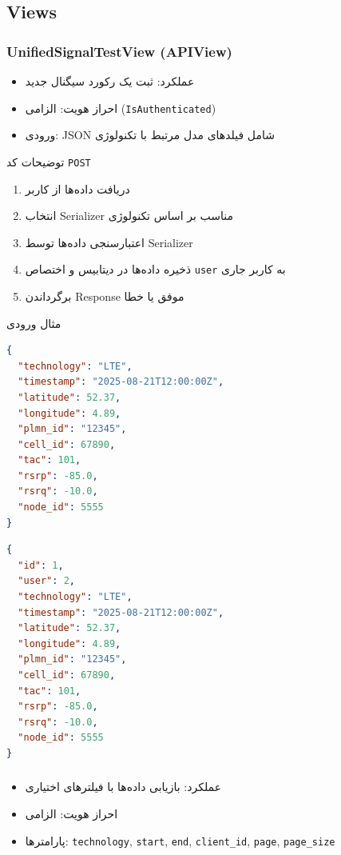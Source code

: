 \documentclass{report}
\begin{document}
\subsection{Views}
\subsubsection{UnifiedSignalTestView (APIView)}
\texttt{}
\begin{itemize}
    \item عملکرد: ثبت یک رکورد سیگنال جدید
    \item احراز هویت: الزامی (\texttt{IsAuthenticated})
    \item ورودی: JSON شامل فیلدهای مدل مرتبط با تکنولوژی
\end{itemize}

توضیحات کد   \texttt{POST}
\begin{enumerate}
    \item دریافت داده‌ها از کاربر
    \item انتخاب Serializer مناسب بر اساس تکنولوژی
    \item اعتبارسنجی داده‌ها توسط Serializer
    \item ذخیره داده‌ها در دیتابیس و اختصاص \texttt{user} به کاربر جاری
    \item برگرداندن Response موفق  یا خطا 
\end{enumerate}

مثال ورودی   \texttt{}
\begin{lstlisting}[language=json]
{
  "technology": "LTE",
  "timestamp": "2025-08-21T12:00:00Z",
  "latitude": 52.37,
  "longitude": 4.89,
  "plmn_id": "12345",
  "cell_id": 67890,
  "tac": 101,
  "rsrp": -85.0,
  "rsrq": -10.0,
  "node_id": 5555
}
\end{lstlisting}

\begin{lstlisting}[language=json]
{
  "id": 1,
  "user": 2,
  "technology": "LTE",
  "timestamp": "2025-08-21T12:00:00Z",
  "latitude": 52.37,
  "longitude": 4.89,
  "plmn_id": "12345",
  "cell_id": 67890,
  "tac": 101,
  "rsrp": -85.0,
  "rsrq": -10.0,
  "node_id": 5555
}
\end{lstlisting}

\subsubsection{}
\begin{itemize}
    \item عملکرد: بازیابی داده‌ها با فیلترهای اختیاری
    \item احراز هویت: الزامی
    \item پارامترها: \texttt{technology}, \texttt{start}, \texttt{end}, \texttt{client\_id}, \texttt{page}, \texttt{page\_size}
\end{itemize}
\end{document}
